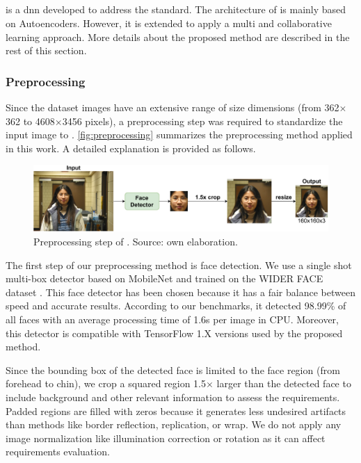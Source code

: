 \subsection{\methodname}

\methodname is a \acl{dnn} developed to address the \icao standard. The architecture of \methodname is mainly based on Autoencoders. However, it is extended to apply a multi and collaborative learning approach. More details about the proposed method are described in the rest of this section. 

\subsubsection{Preprocessing} \label{sec:preprocessing}

Since the \adhoc dataset images have an extensive range of size dimensions (from 362$\times$362 to 4608$\times$3456 pixels), a preprocessing step was required to standardize the input image to \methodname. \autoref{fig:preprocessing} summarizes the preprocessing method applied in this work. A detailed explanation is provided as follows.

\begin{figure}
\centering
\includegraphics[width=\linewidth]{images/preprocessing.pdf}
\caption{Preprocessing step of \methodname. Source: own elaboration.}
\label{fig:preprocessing}
\end{figure}

The first step of our preprocessing method is face detection. We use a single shot multi-box detector based on MobileNet \citep{yeephycho} and trained on the WIDER FACE dataset \citep{yang2016wider}. This face detector has been chosen because it has a fair balance between speed and accurate results. According to our benchmarks, it detected 98.99\% of all faces with an average processing time of 1.6s per image in CPU. Moreover, this detector is compatible with TensorFlow 1.X versions used by the proposed method. 

Since the bounding box of the detected face is limited to the face region (from forehead to chin), we crop a squared region 1.5$\times$ larger than the detected face to include background and other relevant information to assess the requirements. Padded regions are filled with zeros because it generates less undesired artifacts than methods like border reflection, replication, or wrap. We do not apply any image normalization like illumination correction or rotation as it can affect requirements evaluation. 

